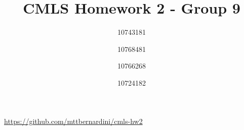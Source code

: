 \documentclass[a4paper,11pt]{article}
\title{CMLS Homework 2 - Group 9}
\author{10743181 \and 10768481 \and 10766268 \and 10724182}
\date{}
\begin{document}
	\maketitle
	{\footnotesize\hfill\url{https://github.com/mttbernardini/cmls-hw2}}

	
	
	
	
	
	
	
	
\end{document}
